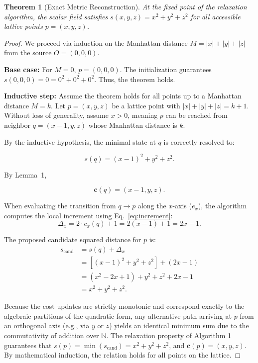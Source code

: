 \documentclass[11pt,a4paper]{article}
\newtheorem{theorem}{Theorem}
\begin{document}
\begin{theorem}[Exact Metric Reconstruction]
At the fixed point of the relaxation algorithm, the scalar field satisfies $s(x,y,z) = x^2 + y^2 + z^2$ for all accessible lattice points $p = (x,y,z)$.
\end{theorem}

\begin{proof}
We proceed via induction on the Manhattan distance $M = |x| + |y| + |z|$ from the source $O = (0,0,0)$.

\textbf{Base case:} For $M = 0$, $p = (0,0,0)$. The initialization guarantees $s(0,0,0) = 0 = 0^2 + 0^2 + 0^2$. Thus, the theorem holds.

\textbf{Inductive step:} Assume the theorem holds for all points up to a Manhattan distance $M = k$. Let $p = (x,y,z)$ be a lattice point with $|x| + |y| + |z| = k + 1$. Without loss of generality, assume $x > 0$, meaning $p$ can be reached from neighbor $q = (x-1, y, z)$ whose Manhattan distance is $k$.

By the inductive hypothesis, the minimal state at $q$ is correctly resolved to:

\[
s(q) = (x-1)^2 + y^2 + z^2.
\]

By Lemma~1,

\[
\mathbf{c}(q)=(x-1,y,z).
\]

When evaluating the transition from $q \to p$ along the $x$-axis ($e_x$), the algorithm computes the local increment using Eq.~\eqref{eq:increment}:
\[
\Delta_x = 2 \cdot c_x(q) + 1 = 2(x-1) + 1 = 2x - 1.
\]

The proposed candidate squared distance for $p$ is:
\begin{align*}
s_{\text{cand}} &= s(q) + \Delta_x \\
&= \left[ (x-1)^2 + y^2 + z^2 \right] + (2x - 1) \\
&= (x^2 - 2x + 1) + y^2 + z^2 + 2x - 1 \\
&= x^2 + y^2 + z^2.
\end{align*}

Because the cost updates are strictly monotonic and correspond exactly to the algebraic partitions of the quadratic form, any alternative path arriving at $p$ from an orthogonal axis (e.g., via $y$ or $z$) yields an identical minimum sum due to the commutativity of addition over $\mathbb{N}$. The relaxation property of Algorithm 1 guarantees that $s(p) = \min(s_{\text{cand}}) = x^2 + y^2 + z^2$, and $\mathbf{c}(p) = (x, y, z)$. By mathematical induction, the relation holds for all points on the lattice.
\end{proof}
\end{document}

